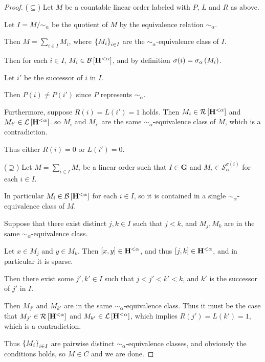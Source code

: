 \begin{proof}
  ($\subseteq$) Let $M$ be a countable linear order labeled with $P$, $L$ and $R$ as above.

  Let $I = M / \sim_{\alpha}$ be the quotient of $M$ by the equivalence relation $\sim_{\alpha}$.

  Then $M = \sum_{i \in I} M_i$,
  where $\left\{ {M_i} \right\}_{i \in I}$ are the $\sim_{\alpha}$-equivalence class of $I$.

  Then for each $i \in I$, $M_i \in \mathcal{B} \left[ {{\mathbf{H}_{}^{< \alpha}}} \right]$,
  and by definition $\sigma(i) = \sigma_{\alpha} \left( {M_i} \right)$.

  Let $i'$ be the successor of $i$ in $I$.

  Then $P(i) \ne P(i')$ since $P$ represents $\sim_{\alpha}$.

  Furthermore, suppose $R(i) = L(i') = 1$ holds.
  Then $M_i \in \mathcal{R} \left[ {{\mathbf{H}_{}^{< \alpha}}} \right]$ and $M_{i'} \in \mathcal{L} \left[ {{\mathbf{H}_{}^{< \alpha}}} \right]$.
  so $M_i$ and $M_{i'}$ are the same $\sim_{\alpha}$-equivalence class of $M$,
  which is a contradiction.

  Thus either $R(i) = 0$ or $L(i') = 0$.

  ($\supseteq$) Let $M = \sum_{i \in I} M_i$ be a linear order
  such that $I \in \mathbf{G}$ and $M_i \in \mathcal{S}^{\sigma(i)}_{\alpha}$ for each $i \in I$.

  In particular $M_i \in \mathcal{B} \left[ {{\mathbf{H}_{}^{< \alpha}}} \right]$ for each $i \in I$, so it is contained
  in a single $\sim_{\alpha}$-equivalence class of $M$.

  Suppose that there exist distinct $j ,k \in I$ such that $j < k$, and
  $M_j, M_k$ are in the same $\sim_{\alpha}$-equivalence class.

  Let $x \in M_j$ and $y \in M_k$.
  Then $[x, y] \in \mathbf{H}_{}^{< \alpha}$,
  and thus $[j, k] \in \mathbf{H}_{}^{< \alpha}$,
  and in particular it is sparse.

  Then there exist some $j', k' \in I$ such that $j < j' < k' < k$,
  and $k'$ is the successor of $j'$ in $I$.

  Then $M_{j'}$ and $M_{k'}$ are in the same $\sim_{\alpha}$-equivalence class.
  Thus it must be the case that $M_{j'} \in \mathcal{R} \left[ {{\mathbf{H}_{}^{< \alpha}}} \right]$ and $M_{k'} \in \mathcal{L} \left[ {{\mathbf{H}_{}^{< \alpha}}} \right]$,
  which implies $R(j') = L(k') = 1$, which is a contradiction.

  Thus $\left\{ {M_i} \right\}_{i \in I}$ are pairwise distinct $\sim_{\alpha}$-equivalence classes,
  and obviously the conditions holds,
  so $M \in C$ and we are done.
\end{proof}

